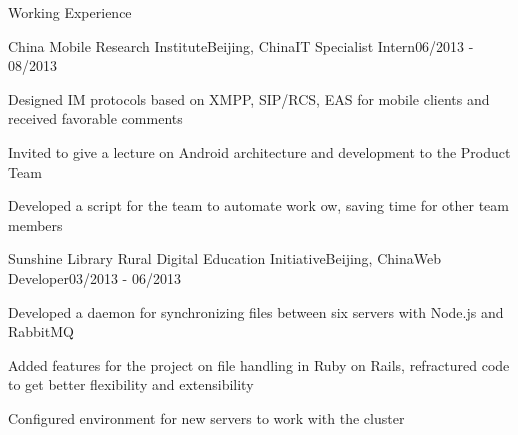 \documentclass{resume} %
\begin{document}
\begin{rSection}{Working Experience}
\begin{rSubsection}{China Mobile Research Institute}{Beijing, China}{IT Specialist Intern}{06/2013 - 08/2013}
\vspace{-0.4em}
\item Designed IM protocols based on XMPP, SIP/RCS, EAS for mobile clients and  received favorable comments
\item Invited to give a lecture on Android architecture and development to the Product Team
\item Developed a script for the team to automate work ow, saving time for other team members
\end{rSubsection}
\vspace{-0.8em}
\begin{rSubsection}{Sunshine Library Rural Digital Education Initiative}{Beijing, China}{Web Developer}{03/2013 - 06/2013}
\vspace{-0.4em}
\item Developed a daemon for synchronizing files between six servers with Node.js and RabbitMQ
\item Added features for the project on file handling in Ruby on Rails, refractured code to get better flexibility and
extensibility
\item Configured environment for new servers to work with the cluster
\end{rSubsection}
\end{rSection}
\vspace{-1.0em}
\end{document}
